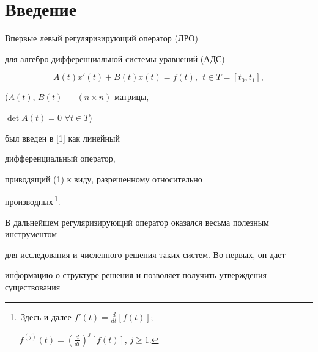 \date{}




\pagestyle{plain} %







\maketitle


\label{begin}








\section*{Введение}





Впервые левый регуляризирующий оператор (ЛРО)


для алгебро-дифференциальной системы уравнений (АДС)


\begin{equation}


A(t)x'(t)+B(t)x(t)=f(t),\ \ t \in T=[t_0,t_1],


\end{equation}


($A(t)$, $B(t)$ --- $(n\times n)$-матрицы,


$\det A(t) = 0$\; $\forall t \in T$)


был введен в [1] как линейный 


дифференциальный оператор,


приводящий (1) к виду, разрешенному относительно


производных\,\footnote{\,Здесь и далее $f'(t)=\frac{d}{dt}[f(t)]$;


$f^{(j)}(t)=\left( \frac{d}{dt}\right)^j [f(t)]$, $j\ge 1.$}.





В дальнейшем регуляризирующий оператор оказался весьма полезным инструментом


для исследования и численного решения таких систем. Во-первых, он дает


информацию о структуре решения и позволяет получить утверждения существования


